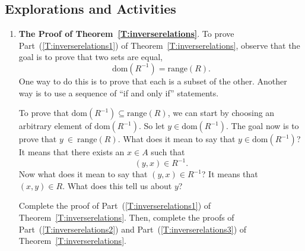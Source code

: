 \subsection*{Explorations and Activities}
\setcounter{oldenumi}{\theenumi}
\begin{enumerate} \setcounter{enumi}{\theoldenumi} 
\item \textbf{The Proof of Theorem~\ref{T:inverserelations}}.  To prove Part~(\ref{T:inverserelations1}) of \label{exer:provinginverse}
Theorem~\ref{T:inverserelations}, observe that the goal is to prove that two sets are equal, 
\[
\text{dom}\!\left( {R^{ - 1} } \right) = \text{range}( R )\!.
\]
One way to do this is to prove that each is a subset of the other.  Another way is to use a sequence of  ``if and only if'' statements.

To prove that  $\text{dom}\!\left( {R^{ - 1} } \right) \subseteq \text{range}( R )$, we can start by choosing an arbitrary element of  $\text{dom}\!\left( {R^{ - 1} } \right)$.  So let  
$y \in \text{dom}\!\left( {R^{ - 1} } \right)$.  The goal now is to prove that 
$y~\in~\text{range}( R )$.  What does it mean to say that  
$y \in \text{dom}\!\left( {R^{ - 1} } \right)$?  It means that there exists an  $x \in A$  such that
\[
\left( {y, x} \right) \in R^{ - 1}. 
\]
Now what does it mean to say that  $( {y, x} ) \in R^{ - 1} $?  It means that  
$( {x, y} ) \in R$.  What does this tell us about  $y$?

Complete the proof of Part~(\ref{T:inverserelations1}) of Theorem~\ref{T:inverserelations}.  Then, complete the proofs of Part~(\ref{T:inverserelations2}) and Part~(\ref{T:inverserelations3}) of Theorem~\ref{T:inverserelations}.

\end{enumerate}


\hbreak


\endinput

